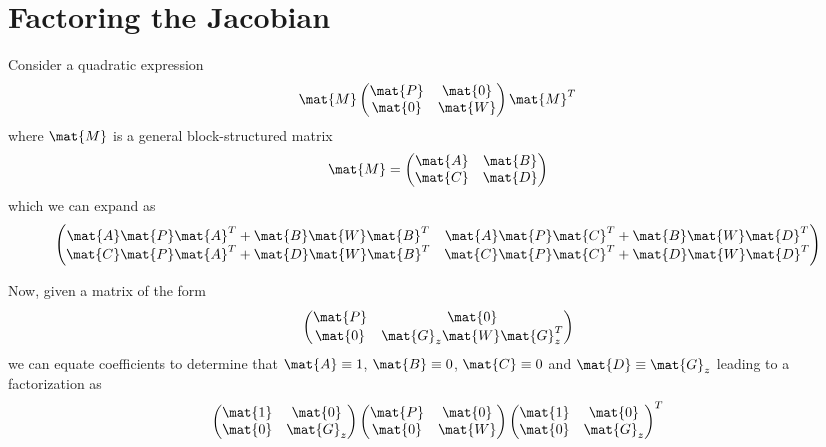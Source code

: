 \documentclass[a4paper]{article}
\begin{document}
\appendix
\section{Factoring the Jacobian}
Consider a quadratic expression
\[
\mat{M} \begin{pmatrix} \mat{P} & \mat{0} \\ \mat{0} & \mat{W} \end{pmatrix} \mat{M}^T
\]
where $\mat{M}$ is a general block-structured matrix
\[
\mat{M} = \begin{pmatrix} \mat{A} & \mat{B} \\ \mat{C} & \mat{D} \end{pmatrix}
\]
which we can expand as 
\[
\begin{pmatrix} \mat{A} \mat{P} \mat{A}^T + \mat{B} \mat{W}\mat{B}^T & 
  \mat{A} \mat{P} \mat{C}^T + \mat{B} \mat{W}\mat{D}^T \\
  \mat{C} \mat{P} \mat{A}^T + \mat{D} \mat{W}\mat{B}^T &
  \mat{C} \mat{P} \mat{C}^T + \mat{D} \mat{W}\mat{D}^T \end{pmatrix}
\]

Now, given a matrix of the form
\[
\begin{pmatrix} \mat{P} & \mat{0} \\ \mat{0} & \mat{G}_z \mat{W}   \mat{G}_z^T \end{pmatrix}
\]
we can equate coefficients to determine that $\mat{A} \equiv 1$, $\mat{B} \equiv 0$, $\mat{C} \equiv 0$ and $\mat{D} \equiv \mat{G}_z$ leading to a factorization as
\[
\begin{pmatrix} \mat{1}& \mat{0} \\ \mat{0} & \mat{G}_z \end{pmatrix}
\begin{pmatrix} \mat{P} & \mat{0} \\ \mat{0} & \mat{W} \end{pmatrix}
\begin{pmatrix} \mat{1}& \mat{0} \\ \mat{0} & \mat{G}_z \end{pmatrix}^T
\]
\end{document}
